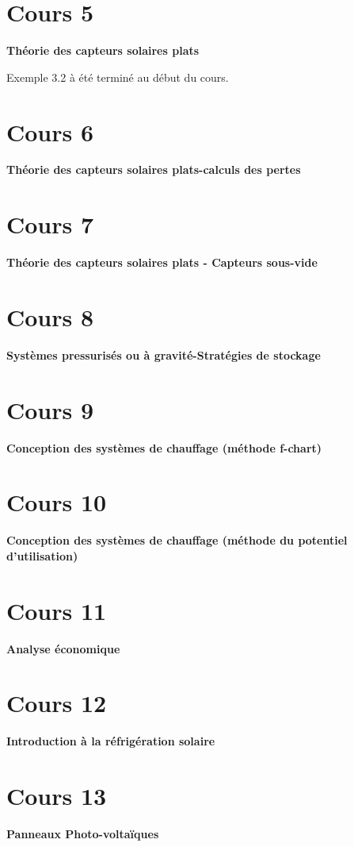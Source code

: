 \documentclass[letterpaper,10pt,english]{sphinxmanual}
\begin{document}
\section{Cours 5}
\label{ENR835:cours-5}
\textbf{Théorie des capteurs solaires plats}

Exemple 3.2 à été terminé au début du cours.


\section{Cours 6}
\label{ENR835:cours-6}
\textbf{Théorie des capteurs solaires plats-calculs des pertes}


\section{Cours 7}
\label{ENR835:cours-7}
\textbf{Théorie des capteurs solaires plats - Capteurs sous-vide}


\section{Cours 8}
\label{ENR835:cours-8}
\textbf{Systèmes pressurisés ou à gravité-Stratégies de stockage}


\section{Cours 9}
\label{ENR835:cours-9}
\textbf{Conception des systèmes de chauffage (méthode f-chart)}


\section{Cours 10}
\label{ENR835:cours-10}
\textbf{Conception des systèmes de chauffage (méthode  du potentiel d’utilisation)}


\section{Cours 11}
\label{ENR835:cours-11}
\textbf{Analyse économique}


\section{Cours 12}
\label{ENR835:cours-12}
\textbf{Introduction à  la réfrigération solaire}


\section{Cours 13}
\label{ENR835:cours-13}
\textbf{Panneaux Photo-voltaïques}
\end{document}
